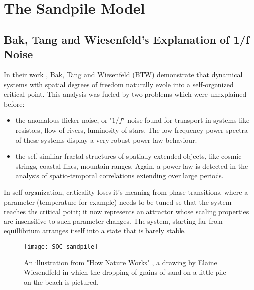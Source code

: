 \clearpage
\section{The Sandpile Model}

\subsection{Bak, Tang and Wiesenfeld's Explanation of 1/f Noise}
In their work \cite{BTW}, Bak, Tang and Wiesenfeld (BTW) demonstrate that dynamical systems with spatial degrees of freedom naturally evole into a self-organized critical point. This analysis was fueled by two problems which were unexplained before:
\begin{itemize}
	\item the anomalous flicker noise, or "$1/f$" noise found for transport in systems like resistors, flow of rivers, luminosity of stars. The low-frequency power spectra of these systems display a very robust power-law behaviour.
	\item the self-similiar fractal structures of spatially extended objects, like cosmic strings, coastal lines, mountain ranges. Again, a power-law is detected in the analysis of spatio-temporal correlations extending over large periods.
\end{itemize}
In self-organization, criticality loses it's meaning from phase transitions, where a parameter (temperature for example) needs to be tuned so that the system reaches the critical point; it now represents an attractor whose scaling properties are insensitive to such parameter changes. The system, starting far from equillibrium arranges itself into a state that is barely stable.\par 

\begin{figure}[!h]
  \centering
  \texttt{[image: SOC\_sandpile]}
  \caption{An illustration from "How Nature Works" \cite{natureworks}, a drawing by Elaine Wiesendfeld in which the dropping of grains of sand on a little pile on the beach is pictured.}
  \label{fig:driverBlock}
\end{figure}



